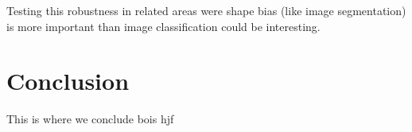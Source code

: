 \documentclass{article}
\begin{document}
Testing this robustness in related areas were shape bias (like image segmentation) 
is more important than image classification could be interesting.

\section{Conclusion}

This is where we conclude bois hjf











\end{document}
